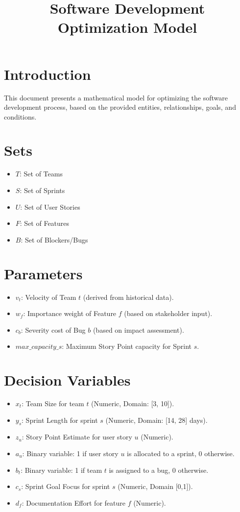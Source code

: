 \documentclass{article}
\begin{document}
\title{Software Development Optimization Model}
\date{}
\maketitle

\section{Introduction}
This document presents a mathematical model for optimizing the software development process, based on the provided entities, relationships, goals, and conditions.

\section{Sets}
\begin{itemize}
    \item $T$: Set of Teams
    \item $S$: Set of Sprints
    \item $U$: Set of User Stories
    \item $F$: Set of Features
    \item $B$: Set of Blockers/Bugs
\end{itemize}

\section{Parameters}
\begin{itemize}
    \item $v_t$: Velocity of Team $t$ (derived from historical data).
    \item $w_f$: Importance weight of Feature $f$ (based on stakeholder input).
    \item $c_b$: Severity cost of Bug $b$ (based on impact assessment).
    \item $max\_capacity\_s$: Maximum Story Point capacity for Sprint $s$.
\end{itemize}

\section{Decision Variables}
\begin{itemize}
    \item $x_t$: Team Size for team $t$ (Numeric, Domain: [3, 10]).
    \item $y_s$: Sprint Length for sprint $s$ (Numeric, Domain: [14, 28] days).
    \item $z_u$: Story Point Estimate for user story $u$ (Numeric).
    \item $a_u$: Binary variable: 1 if user story $u$ is allocated to a sprint, 0 otherwise.
    \item $b_t$: Binary variable: 1 if team $t$ is assigned to a bug, 0 otherwise.
    \item $c_s$: Sprint Goal Focus for sprint $s$ (Numeric, Domain [0,1]).
    \item $d_f$: Documentation Effort for feature $f$ (Numeric).
\end{itemize}
\end{document}
